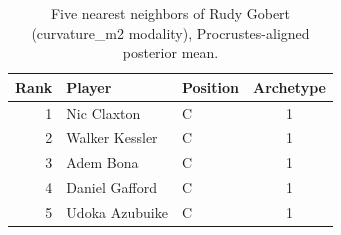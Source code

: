 \begin{table}[htbp]
  \centering\small
  \begin{tabular}{rllc}
    \toprule
    Rank & Player & Position & Archetype \\
    \midrule
    1 & Nic Claxton & C & 1 \\
    2 & Walker Kessler & C & 1 \\
    3 & Adem Bona & C & 1 \\
    4 & Daniel Gafford & C & 1 \\
    5 & Udoka Azubuike & C & 1 \\
    \bottomrule
  \end{tabular}
  \caption{Five nearest neighbors of Rudy Gobert (curvature_m2 modality), Procrustes-aligned posterior mean.}
  \label{tab:Rudy_Gobert_neighbors_curvature_m2}
\end{table}

